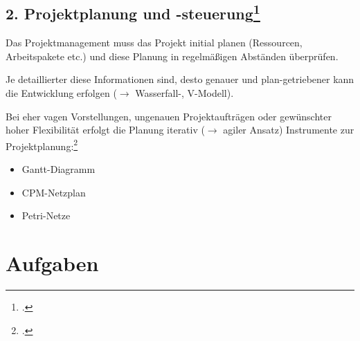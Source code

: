 \documentclass{lehramt-informatik}
\begin{document}
\section{2. Projektplanung und -steuerung\footcite[Seite 19]{sosy:fs:1}}

Das Projektmanagement muss das Projekt initial planen (Ressourcen,
Arbeitspakete etc.) und diese Planung in regelmäßigen Abständen
überprüfen.

Je detaillierter diese Informationen sind, desto genauer und
plan-getriebener kann die Entwicklung erfolgen ($\rightarrow$
Wasserfall-, V-Modell).

Bei eher vagen Vorstellungen, ungenauen Projektaufträgen oder
gewünschter hoher Flexibilität erfolgt die Planung iterativ
($\rightarrow$ agiler Ansatz) Instrumente zur
Projektplanung:\footcite[Seite 25-27]{schatten}

\begin{itemize}
\item Gantt-Diagramm
\item CPM-Netzplan
\item Petri-Netze
\end{itemize}


\chapter{Aufgaben}

\literatur
\end{document}
